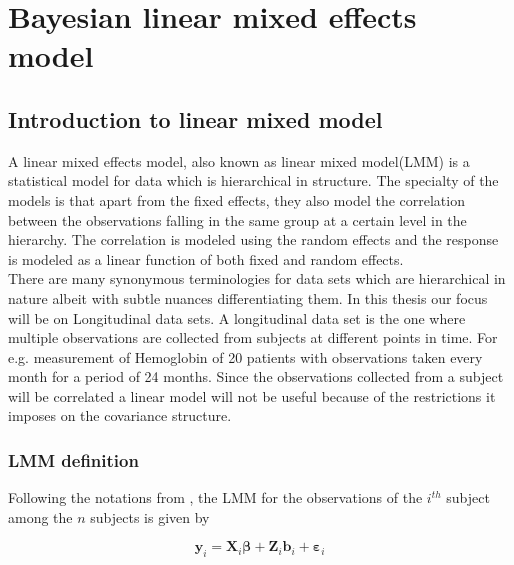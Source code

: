 
\chapter{Bayesian linear mixed effects model}
\label{ch : blmm}

\section{Introduction to linear mixed model}
\label{sec : lmm}
A linear mixed effects model, also known as linear mixed model(LMM) is a statistical model for data which is hierarchical in structure. The specialty of the models is that apart from the fixed effects, they also model the correlation between the observations falling in the same group at a certain level in the hierarchy. The correlation is modeled using the random effects and the response is modeled as a linear function of both fixed and random effects.\\

There are many synonymous terminologies for data sets which are hierarchical in nature albeit with subtle nuances differentiating them. In this thesis our focus will be on Longitudinal data sets. A longitudinal data set is the one where multiple observations are collected from subjects at different points in time. For e.g. measurement of Hemoglobin of 20 patients with observations taken every month for a period of 24 months. Since the observations collected from a subject will be correlated a linear model will not be useful because of the restrictions it imposes on the covariance structure.

\subsection{LMM definition}
\label{subsec : lmm_definition}
Following the notations from \citet{lesaffre_bayesian_2012}, the LMM for the observations of the $i^{th}$ subject among the $n$ subjects is given by

\begin{equation}
\label{eq : lmm_definition}
\boldsymbol{y}_i = \boldsymbol{X}_{i}\boldsymbol{\beta} + \boldsymbol{Z}_{i}\boldsymbol{b}_{i} + \boldsymbol{\varepsilon}_{i}
\end{equation}

